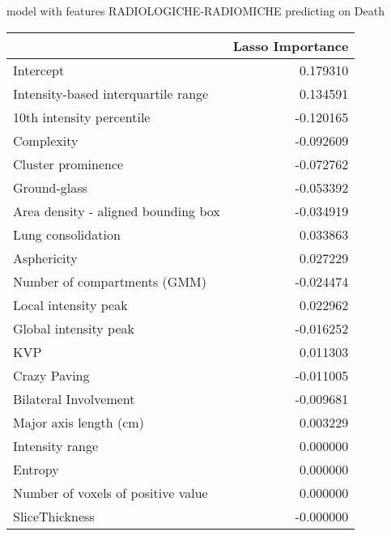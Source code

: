 model with features RADIOLOGICHE-RADIOMICHE predicting on Death\newline
\begin{tabular}{lr}
\toprule
{} &  Lasso Importance \\
\midrule
Intercept                           &          0.179310 \\
Intensity-based interquartile range &          0.134591 \\
10th intensity percentile           &         -0.120165 \\
Complexity                          &         -0.092609 \\
Cluster prominence                  &         -0.072762 \\
Ground-glass                        &         -0.053392 \\
Area density - aligned bounding box &         -0.034919 \\
Lung consolidation                  &          0.033863 \\
Asphericity                         &          0.027229 \\
Number of compartments (GMM)        &         -0.024474 \\
Local intensity peak                &          0.022962 \\
Global intensity peak               &         -0.016252 \\
KVP                                 &          0.011303 \\
Crazy Paving                        &         -0.011005 \\
Bilateral Involvement               &         -0.009681 \\
Major axis length (cm)              &          0.003229 \\
Intensity range                     &          0.000000 \\
Entropy                             &          0.000000 \\
Number of voxels of positive value  &          0.000000 \\
SliceThickness                      &         -0.000000 \\
\bottomrule
\end{tabular}

